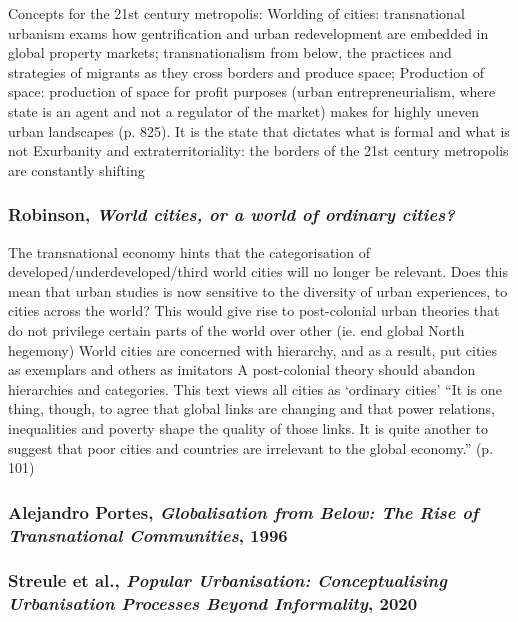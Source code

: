 \documentclass{article}
\begin{document}
\begin{outline}
	\1 Concepts for the 21st century metropolis:
		\2 Worlding of cities: transnational urbanism exams how gentrification and urban redevelopment are embedded in global property markets; transnationalism from below, the practices and strategies of migrants as they cross borders and produce space; 
		\2 Production of space: production of space for profit purposes (urban entrepreneurialism, where state is an agent and not a regulator of the market) makes for highly uneven urban landscapes (p. 825). It is the state that dictates what is formal and what is not
		\2 Exurbanity and extraterritoriality: the borders of the 21st century metropolis are constantly shifting
\end{outline}


\subsubsection{Robinson, \textit{World cities, or a world of ordinary cities?}}

\begin{outline}
	\1 The transnational economy hints that the categorisation of developed/underdeveloped/third world cities will no longer be relevant. Does this mean that urban studies is now sensitive to the diversity of urban experiences, to cities across the world? This would give rise to post-colonial urban theories that do not privilege certain parts of the world over other (ie. end global North hegemony)
	\1 World cities are concerned with hierarchy, and as a result, put cities as exemplars and others as imitators
	\1 A post-colonial theory should abandon hierarchies and categories. This text views all cities as `ordinary cities'
	\1 ``It is one thing, though, to agree that global links are changing and that power relations, inequalities and poverty shape the quality of those links. It is quite another to suggest that poor cities and countries are irrelevant to the global economy.'' (p. 101)
\end{outline}


\subsubsection{Alejandro Portes, \textit{Globalisation from Below: The Rise of Transnational Communities}, 1996}

\subsubsection{Streule et al., \textit{Popular Urbanisation: Conceptualising Urbanisation Processes Beyond Informality}, 2020}
\end{document}
